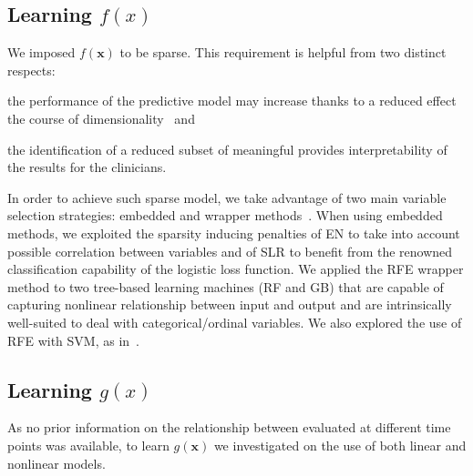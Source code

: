 \subsection{Learning $f(x)$} \label{sec:learning_f}


We imposed $f(\bm{x})$ to be sparse. This requirement is helpful from two distinct respects:
\begin{enumerate*}[label=\alph*)]
	\item the performance of the predictive model may increase thanks to a reduced effect the course of dimensionality~\cite{hastie2015statistical} and
	\item the identification of a reduced subset of meaningful \PCOs provides interpretability of the results for the clinicians.
\end{enumerate*}
In order to achieve such sparse model, we take advantage of two main variable selection strategies: embedded and wrapper methods~\cite{guyon2003introduction}.
When using embedded methods, we exploited the sparsity inducing penalties of EN to take into account possible correlation between \PCO variables and of SLR to benefit from the renowned classification capability of the logistic loss function.
We applied the RFE wrapper method to
two tree-based learning machines (RF and GB) that are capable of capturing nonlinear relationship between input and output and are intrinsically well-suited to deal with categorical/ordinal variables. We also explored the use of RFE with SVM, as in~\cite{guyon2002gene}.

\subsection{Learning $g(x)$}

As no prior information on the relationship between \PCOs evaluated at different time points was available, to learn $g(\bm{x})$ we investigated on the use of both linear and nonlinear models.

